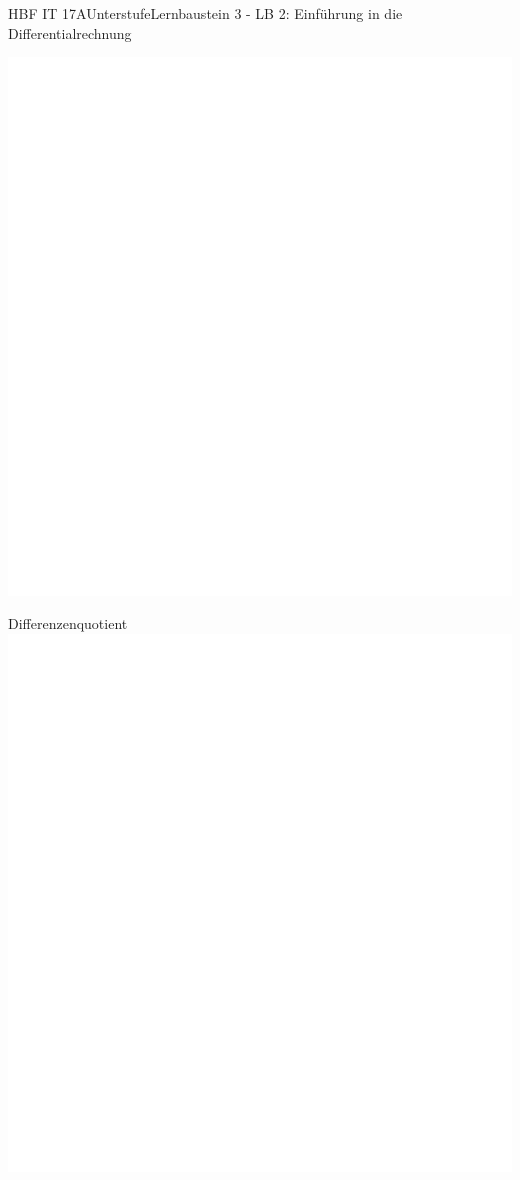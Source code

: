 \documentclass[oneside,openany,headings=optiontotoc,11pt,numbers=noenddot]{scrreprt}
\begin{document}
\begin{worksheet}{HBF IT 17A}{Unterstufe}{Lernbaustein 3 - LB 2: Einführung in die Differentialrechnung}
		\begin{framed}
			\includegraphics[height=0.6\textheight]{../empty.jpg}
		\end{framed}
		\begin{framed}
			\tiny{\color{codegray}Differenzenquotient}\\
			\includegraphics[height=0.3\textheight]{../empty.jpg}
		\end{framed}		
	\end{worksheet}
\end{document}
